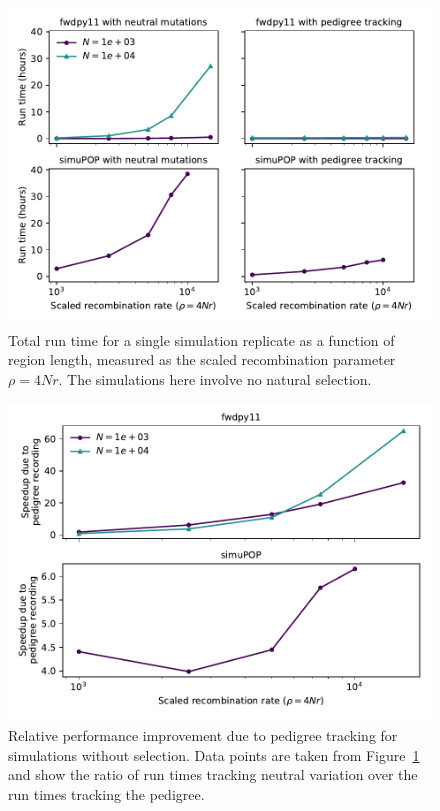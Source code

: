 \documentclass{article}
\begin{document}
\renewcommand{\thefigure}{A\arabic{figure}}
\setcounter{figure}{0}

\begin{figure}[!h]
    \includegraphics[]{sims/rawspeed_nosel}
    \caption{\label{sfig:rawspeed_nosel}Total run time for a single simulation replicate as a function of region
        length, measured as the scaled recombination parameter $\rho = 4Nr$.  The simulations here involve no natural
    selection.}
\end{figure}

\begin{figure}
    \includegraphics[]{sims/speedup_nosel}
    \caption{\label{sfig:speedup_nosel}Relative performance improvement due to pedigree tracking for simulations without
    selection.  Data points are taken from Figure~\ref{sfig:rawspeed_nosel} and show the ratio of run times tracking
neutral variation over the run times tracking the pedigree.}
\end{figure}
\end{document}
